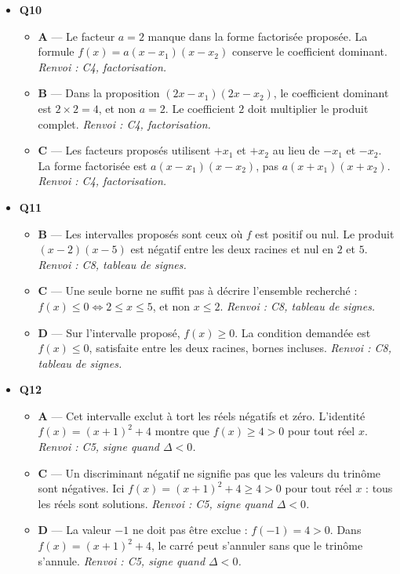 \begin{itemize}
\begin{itemize}
  \end{itemize}
  \item \textbf{Q10}
  \begin{itemize}
    \item \textbf{A} — Le facteur $a=2$ manque dans la forme factorisée proposée. La formule $f(x)=a(x-x_1)(x-x_2)$ conserve le coefficient dominant. \emph{Renvoi : C4, factorisation.}
    \item \textbf{B} — Dans la proposition $(2x-x_1)(2x-x_2)$, le coefficient dominant est $2\times2=4$, et non $a=2$. Le coefficient $2$ doit multiplier le produit complet. \emph{Renvoi : C4, factorisation.}
    \item \textbf{C} — Les facteurs proposés utilisent $+x_1$ et $+x_2$ au lieu de $-x_1$ et $-x_2$. La forme factorisée est $a(x-x_1)(x-x_2)$, pas $a(x+x_1)(x+x_2)$. \emph{Renvoi : C4, factorisation.}
  \end{itemize}
  \item \textbf{Q11}
  \begin{itemize}
    \item \textbf{B} — Les intervalles proposés sont ceux où $f$ est positif ou nul. Le produit $(x-2)(x-5)$ est négatif entre les deux racines et nul en $2$ et $5$. \emph{Renvoi : C8, tableau de signes.}
    \item \textbf{C} — Une seule borne ne suffit pas à décrire l’ensemble recherché : $f(x)\leq0\Leftrightarrow2\leq x\leq5$, et non $x\leq2$. \emph{Renvoi : C8, tableau de signes.}
    \item \textbf{D} — Sur l’intervalle proposé, $f(x)\geq0$. La condition demandée est $f(x)\leq0$, satisfaite entre les deux racines, bornes incluses. \emph{Renvoi : C8, tableau de signes.}
  \end{itemize}
  \item \textbf{Q12}
  \begin{itemize}
    \item \textbf{A} — Cet intervalle exclut à tort les réels négatifs et zéro. L’identité $f(x)=(x+1)^2+4$ montre que $f(x)\geq4>0$ pour tout réel $x$. \emph{Renvoi : C5, signe quand $\Delta<0$.}
    \item \textbf{C} — Un discriminant négatif ne signifie pas que les valeurs du trinôme sont négatives. Ici $f(x)=(x+1)^2+4\geq4>0$ pour tout réel $x$ : tous les réels sont solutions. \emph{Renvoi : C5, signe quand $\Delta<0$.}
    \item \textbf{D} — La valeur $-1$ ne doit pas être exclue : $f(-1)=4>0$. Dans $f(x)=(x+1)^2+4$, le carré peut s’annuler sans que le trinôme s’annule. \emph{Renvoi : C5, signe quand $\Delta<0$.}

\end{itemize}
\end{itemize}
